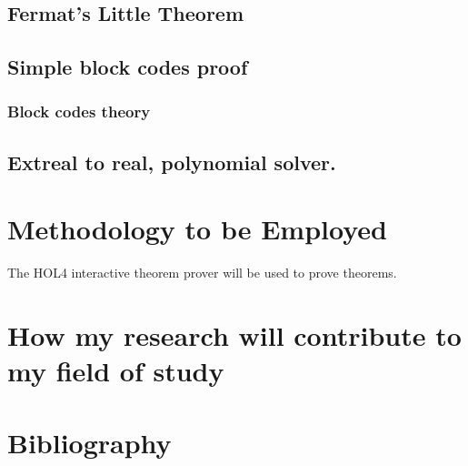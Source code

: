 \documentclass{article}
\begin{document}
\subsection {Fermat's Little Theorem}

\subsection {Simple block codes proof}

\subsubsection {Block codes theory}

\subsubsection{}	


\subsection {Extreal to real, polynomial solver.}


\section{Methodology to be Employed}

The HOL4 interactive theorem prover will be used to prove theorems.

\section{How my research will contribute to my field of study}

\section{Bibliography}
\end{document}
